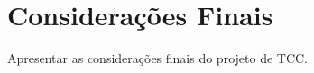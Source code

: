 \chapter{Considerações Finais}
\label{chap:conclusoes}

Apresentar as considerações finais do projeto de TCC.